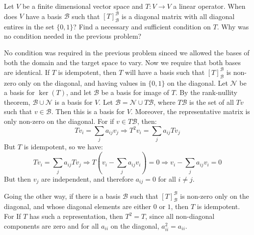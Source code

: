 \documentclass[crop=false,class=article]{standalone}                       %
\begin{document}
        \begin{problem}
            Let $V$ be a finite dimensional vector space and
            $T:V\rightarrow{V}$ a linear operator. When does $V$ have a
            basis $\mathscr{B}$ such that $[T]_{\mathscr{B}}^{\mathscr{B}}$
            is a diagonal matrix with all diagonal entires in the set
            $\{0,1\}$? Find a necessary and sufficient condition on $T$.
            Why was no condition needed in the previous problem?
        \end{problem}
        \begin{solution}
            No condition was required in the previous problem sinced we
            allowed the bases of both the domain and the target space to
            vary. Now we require that both bases are identical. If
            $T$ is idempotent, then $T$ will have a basis such that
            $[T]_{\mathscr{B}}^{\mathscr{B}}$ is non-zero only on the
            diagonal, and having values in $\{0,1\}$ on the diagonal.
            Let $\mathcal{N}$ be a basis for $\ker(T)$, and let
            $\mathcal{B}$ be a basis for image of $T$. By the rank-nullity
            theorem, $\mathcal{B}\cup\mathcal{N}$ is a basis for $V$.
            Let $\mathscr{B}=\mathcal{N}\cup{T}\mathcal{B}$, where
            $T\mathcal{B}$ is the set of all $Tv$ such that
            $v\in\mathcal{B}$. Then this is a basis for $V$. Moreover,
            the representative matrix is only non-zero on the diagonal.
            For if $v\in{T}\mathcal{B}$, then:
            \begin{equation}
                Tv_{i}=\sum_{j}a_{ij}v_{j}
                \Longrightarrow
                T^{2}v_{i}=\sum_{j}a_{ij}Tv_{j}
            \end{equation}
            But $T$ is idempotent, so we have:
            \begin{equation}
                Tv_{i}=\sum_{j}a_{ij}Tv_{j}
                \Longrightarrow
                T(v_{i}-\sum_{j}a_{ij}v_{i})=0
                \Longrightarrow
                v_{i}-\sum_{j}a_{ij}v_{i}=0
            \end{equation}
            But then $v_{j}$ are independent, and therefore
            $a_{ij}=0$ for all $i\ne{j}$.
            \par\hfill\par
            Going the other way, if there is a basis $\mathscr{B}$ such
            that $[T]_{\mathscr{B}}^{\mathscr{B}}$ is non-zero only on
            the diagonal, and whose diagonal elements are either $0$ or
            $1$, then $T$ is idempotent. For If $T$ has such a
            representation, then $T^{2}=T$, since all non-diagonal
            components are zero and for all $a_{ii}$ on the diagonal,
            $a_{ii}^{2}=a_{ii}$.
        \end{solution}
\end{document}
